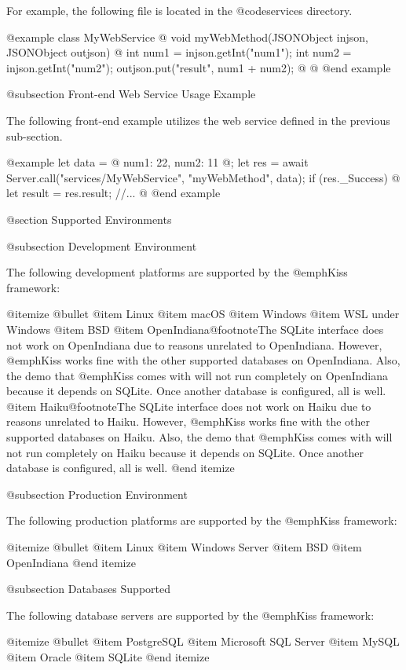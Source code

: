 For example, the following file is located in the
@code{services} directory.

@example
class MyWebService @{
    void myWebMethod(JSONObject injson, JSONObject outjson) @{
        int num1 = injson.getInt("num1");
        int num2 = injson.getInt("num2");
        outjson.put("result", num1 + num2);
    @}
@}
@end example

@subsection Front-end Web Service Usage Example

The following front-end example utilizes the web service defined in the
previous sub-section.

@example
let data = @{
    num1:  22,
    num2:  11
@};
let res = await Server.call("services/MyWebService", "myWebMethod", data);
if (res._Success) @{
    let result = res.result;
    //...
@}
@end example
    

@section Supported Environments

@subsection Development Environment

The following development platforms are supported by the @emph{Kiss}
framework:

@itemize @bullet
@item
Linux
@item
macOS
@item
Windows
@item
WSL under Windows
@item
BSD
@item
OpenIndiana@footnote{The SQLite interface does not work on OpenIndiana due to reasons unrelated to OpenIndiana.
However, @emph{Kiss} works fine with the other supported databases on OpenIndiana.  Also, the demo that @emph{Kiss} comes with will not
run completely on OpenIndiana because it depends on SQLite.  Once another database is configured, all is well.}
@item
Haiku@footnote{The SQLite interface does not work on Haiku due to reasons unrelated to Haiku.
However, @emph{Kiss} works fine with the other supported databases on Haiku.  Also, the demo that @emph{Kiss} comes with will not
run completely on Haiku because it depends on SQLite.  Once another database is configured, all is well.}
@end itemize

@subsection Production Environment


The following production platforms are supported by the @emph{Kiss}
framework:

@itemize @bullet
@item
Linux
@item
Windows Server
@item
BSD
@item
OpenIndiana
@end itemize


@subsection Databases Supported


The following database servers are supported by the @emph{Kiss}
framework:

@itemize @bullet
@item
PostgreSQL
@item
Microsoft SQL Server
@item
MySQL
@item
Oracle
@item
SQLite
@end itemize


